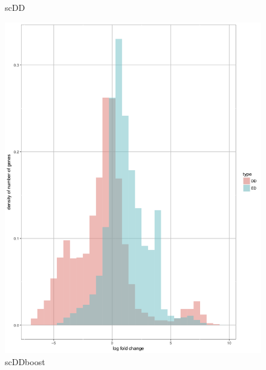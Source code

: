 \documentclass[11pt]{amsart}
\begin{document}
\begin{figure}[H]
  \caption{scDD}\label{fig:scDD}
\endminipage\hfill
{}
  \includegraphics[width=\linewidth]{G74596_scddb.png}
  \caption{scDDboost}\label{fig:scDDboost}
\endminipage\hfill
{}%

\end{figure}
\end{document}
